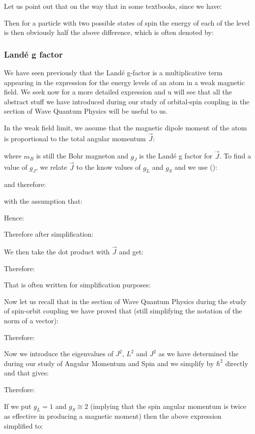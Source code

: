 	Let us point out that on the way that in some textbooks, since we have:
	
	Then for a particle with two possible states of spin the energy of each of the level is then obviously half the above difference, which is often denoted by:
	
	
	\subsubsection{Landé g factor}
	We have seen previously that the Landé g-factor is a multiplicative term appearing in the expression for the energy levels of an atom in a weak magnetic field. We seek now for a more detailed expression and u will see that all the abstract stuff we have introduced during our study of orbital-spin coupling in the section of Wave Quantum Physics will be useful to us.
	
	In the weak field limit, we assume that the magnetic dipole moment of the atom is proportional to the total angular momentum $\vec{J}$:
	
	where $m_B$ is still the Bohr magneton and $g_J$ is the Landé g factor for $\vec{J}$. To find a value of $g_J$, we relate $\vec{J}$ to the know values of $g_L$ and $g_S$ and we use ():
	
	and therefore:
	
	with the assumption that:
	
	Hence:
	
	Therefore after simplification:
	
	We then take the dot product with $\vec{J}$ and get:
	
	Therefore:
	
	That is often written for simplification purposes:
	
	Now let us recall that in the section of Wave Quantum Physics during the study of spin-orbit coupling we have proved that (still simplifying the notation of the norm of a vector):
	
	Therefore:
	
	Now we introduce the eigenvalues of $J^2$, $L^2$ and $J^2$ as we have determined the during our study of Angular Momentum and Spin and we simplify by $\hbar^2$ directly and that gives:
	
	Therefore:
	
	If we put $g_L=1$ and $g_S\cong 2$ (implying that the spin angular momentum is twice as effective in producing a magnetic moment) then the above expression simplified to:
	
